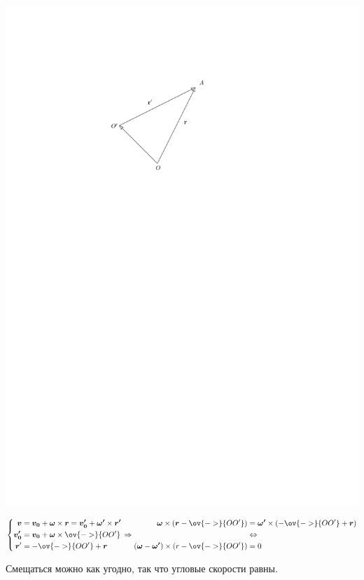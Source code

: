 \documentclass[timbord]{longnotes}
\begin{document}
\begin{minipage}{0.28\linewidth}
\vspace{1em}
\includegraphics[scale=1]{kinscrew}
\vspace{1em}
\end{minipage} \hfill
\begin{minipage}{0.68\linewidth}
$\displaystyle
\left\{
\begin{aligned}
  \v v &= \v{v_0} + \v \omega \times \v{r} = \v{v_0'} + \v{\omega'} \times \v{r'}\\
  \v {v_0'} &= \v{v_0} + \v \omega \times \ov{->} {OO'} \\
  \v r' &= -\ov{->} {OO'} + \v r \\
\end{aligned}\right. \Rightarrow 
\begin{aligned}
  \v\omega \times (\v r - \ov{->} {OO'} ) &= \v{\omega '} \times ( - \ov{->} {OO'} + \v r) \\
                                          &\Leftrightarrow \\
  (\v \omega - \v {\omega'} ) \times ( r- \ov{->}{OO'} ) &= 0
\end{aligned}
$
\end{minipage}
Смещаться можно как угодно, так что угловые скорости равны.
\end{document}
